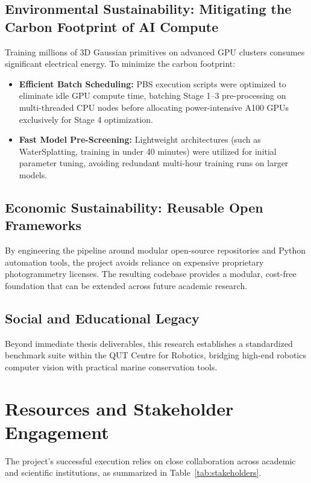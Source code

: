 \subsection{Environmental Sustainability: Mitigating the Carbon Footprint of AI Compute}
Training millions of 3D Gaussian primitives on advanced GPU clusters consumes significant electrical energy. To minimize the carbon footprint:
\begin{itemize}
    \item \textbf{Efficient Batch Scheduling:} PBS execution scripts were optimized to eliminate idle GPU compute time, batching Stage 1--3 pre-processing on multi-threaded CPU nodes before allocating power-intensive A100 GPUs exclusively for Stage 4 optimization.
    \item \textbf{Fast Model Pre-Screening:} Lightweight architectures (such as WaterSplatting, training in under 40 minutes) were utilized for initial parameter tuning, avoiding redundant multi-hour training runs on larger models.
\end{itemize}

\subsection{Economic Sustainability: Reusable Open Frameworks}
By engineering the pipeline around modular open-source repositories and Python automation tools, the project avoids reliance on expensive proprietary photogrammetry licenses. The resulting codebase provides a modular, cost-free foundation that can be extended across future academic research.

\subsection{Social and Educational Legacy}
Beyond immediate thesis deliverables, this research establishes a standardized benchmark suite within the QUT Centre for Robotics, bridging high-end robotics computer vision with practical marine conservation tools.

\section{Resources and Stakeholder Engagement}
\label{sec:stakeholders}
The project's successful execution relies on close collaboration across academic and scientific institutions, as summarized in Table~\ref{tab:stakeholders}.

